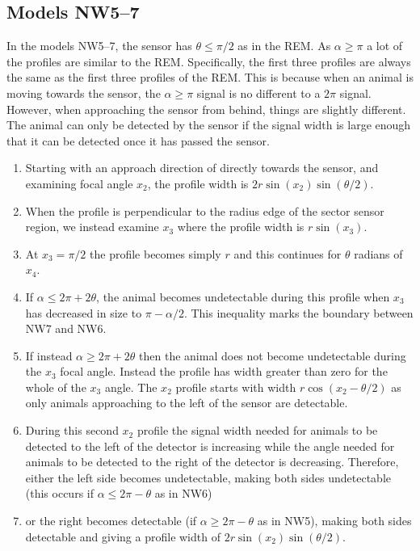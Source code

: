 

\subsection{Models NW5--7} \label{NW57}

In the models NW5--7, the sensor has $\theta \le \pi/2$ as in the REM. As $\alpha \ge \pi$ a lot of the profiles are similar to the REM. Specifically, the first three profiles are always the same as the first three profiles of the REM. This is because when an animal is moving towards the sensor, the $\alpha \ge \pi$ signal is no different to a $2\pi$ signal. However, when approaching the sensor from behind, things are slightly different. The animal can only be detected by the sensor if the signal width is large enough that it can be detected once it has passed the sensor. 
                    
\begin{enumerate}
\item Starting with an approach direction of directly towards the sensor, and examining focal angle $x_2$, the profile width is $2r\sin(x_2)\sin(\theta/2)$. 
\item When the profile is perpendicular to the radius edge of the sector sensor region, we instead examine $x_3$ where the profile width is $r\sin(x_3)$.
\item At $x_3=\pi/2$ the profile becomes simply $r$ and this continues for $\theta $ radians of $x_4$. 
\item If $\alpha \le 2\pi + 2\theta$, the animal becomes undetectable during this profile when  $x_3$ has decreased in size to $\pi - \alpha/2$. This inequality marks the boundary between NW7 and NW6. 
\item If instead $\alpha \ge 2\pi + 2\theta$ then the animal does not become undetectable during the $x_3$ focal angle. Instead the profile has width greater than zero for the whole of the $x_3$ angle. The $x_2$ profile starts with width $r\cos(x_2 - \theta/2)$ as only animals approaching to the left of the sensor are detectable. 
\item During this second $x_2$ profile the signal width needed for animals to be detected to the left of the detector is increasing while the angle needed for animals to be detected to the right of the detector is decreasing. Therefore, either the left side becomes undetectable, making both sides undetectable (this occurs if $\alpha \le 2\pi - \theta$ as in NW6) \item or the right becomes detectable (if $\alpha \ge 2\pi - \theta$ as in NW5), making both sides detectable and giving a profile width of $2r\sin(x_2)\sin(\theta/2)$.
\end{enumerate}


